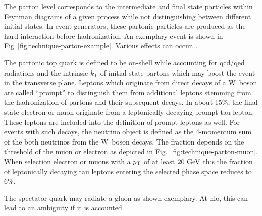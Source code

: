 The parton level corresponds to the intermediate and final state particles within Feynman diagrams of a given process while not distinguishing between different initial states. In event generators, these partonic particles are produced as the hard interaction before hadronization. An exemplary event is shown in Fig~\ref{fig:technique-parton-example}. Various effects can occur...



The partonic top quark is defined to be on-shell while accounting for \gls{qcd}/\gls{qed} radiations and the intrinsic $k_\mathrm{T}$ of initial state partons which may boost the event in the transverse plane. Leptons which originate from direct decays of a W~boson are called ``prompt'' to distinguish them from additional leptons stemming from the hadronization of partons and their subsequent decays.  In about 15\%, the final state electron or muon originate from a leptonically decaying prompt tau lepton. These leptons are included into the definition of prompt leptons as well. For events with such decays, the neutrino object is defined as the 4-momentum sum of the both neutrinos from the W~boson decays. The fraction depends on the \pt threshold of the muon or electron as depicted in Fig.~\ref{fig:technique-parton-muon}. When selection electron or muons with a $p_\mathrm{T}$ of at least $20~\mathrm{GeV}$ this the fraction of leptonically decaying tau leptons entering the selected phase space reduces to 6\%.


The spectator quark may radiate a gluon as shown exemplary. At \gls{nlo}, this can lead to an ambiguity if it is accounted

